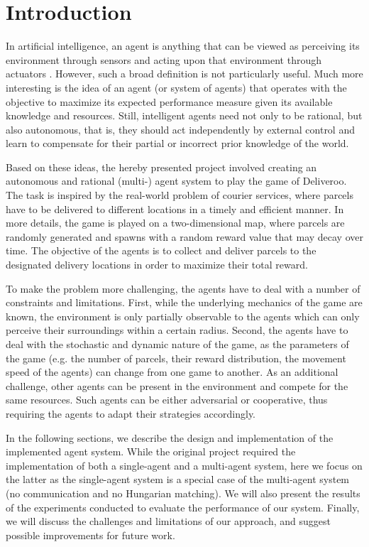 \section{Introduction}

In artificial intelligence, an agent is anything that can be viewed as perceiving its environment through sensors and acting upon that environment through actuators \parencite{russel2010}. However, such a broad definition is not particularly useful. Much more interesting is the idea of an agent (or system of agents) that operates with the objective to maximize its expected performance measure given its available knowledge and resources. Still, intelligent agents need not only to be rational, but also autonomous, that is, they should act independently by external control and learn to compensate for their partial or incorrect prior knowledge of the world.

Based on these ideas, the hereby presented project involved creating an autonomous and rational (multi-) agent system to play the game of Deliveroo. The task is inspired by the real-world problem of courier services, where parcels have to be delivered to different locations in a timely and efficient manner. In more details, the game is played on a two-dimensional map, where parcels are randomly generated and spawns with a random reward value that may decay over time. The objective of the agents is to collect and deliver parcels to the designated delivery locations in order to maximize their total reward.

To make the problem more challenging, the agents have to deal with a number of constraints and limitations. First, while the underlying mechanics of the game are known, the environment is only partially observable to the agents which can only perceive their surroundings within a certain radius. Second, the agents have to deal with the stochastic and dynamic nature of the game, as the parameters of the game (e.g. the number of parcels, their reward distribution, the movement speed of the agents) can change from one game to another. As an additional challenge, other agents can be present in the environment and compete for the same resources. Such agents can be either adversarial or cooperative, thus requiring the agents to adapt their strategies accordingly.

In the following sections, we describe the design and implementation of the implemented agent system. While the original project required the implementation of both a single-agent and a multi-agent system, here we focus on the latter as the single-agent system is a special case of the multi-agent system (no communication and no Hungarian matching). We will also present the results of the experiments conducted to evaluate the performance of our system. Finally, we will discuss the challenges and limitations of our approach, and suggest possible improvements for future work.